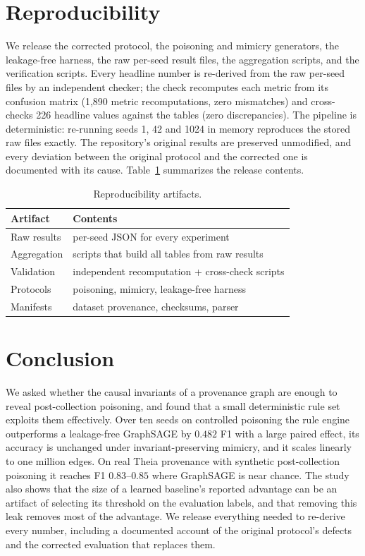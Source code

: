 \documentclass[journal]{IEEEtran}
\begin{document}
\section{Reproducibility}
\label{sec:repro}
We release the corrected protocol, the poisoning and mimicry generators, the
leakage-free harness, the raw per-seed result files, the aggregation scripts,
and the verification scripts. Every headline number is re-derived from the raw
per-seed files by an independent checker; the check recomputes each metric from
its confusion matrix (1{,}890 metric recomputations, zero mismatches) and
cross-checks 226 headline values against the tables (zero discrepancies). The
pipeline is deterministic: re-running seeds 1, 42 and 1024 in memory reproduces
the stored raw files exactly. The repository's original results are preserved
unmodified, and every deviation between the original protocol and the corrected
one is documented with its cause. Table~\ref{tab:repro} summarizes the release
contents.

\begin{table}[t]
\centering
\small
\caption{Reproducibility artifacts.}
\label{tab:repro}
\begin{tabular}{p{3.0cm}p{4.7cm}}
\toprule
Artifact & Contents \\
\midrule
Raw results & per-seed JSON for every experiment \\
Aggregation & scripts that build all tables from raw results \\
Validation & independent recomputation + cross-check scripts \\
Protocols & poisoning, mimicry, leakage-free harness \\
Manifests & dataset provenance, checksums, parser \\
\bottomrule
\end{tabular}
\end{table}

\section{Conclusion}
We asked whether the causal invariants of a provenance graph are enough to reveal
post-collection poisoning, and found that a small deterministic rule set exploits
them effectively. Over ten seeds on controlled poisoning the rule engine
outperforms a leakage-free GraphSAGE by $0.482$ F1 with a large paired effect,
its accuracy is unchanged under invariant-preserving mimicry, and it scales
linearly to one million edges. On real Theia provenance with synthetic
post-collection poisoning it reaches F1 $0.83$--$0.85$ where GraphSAGE is near
chance. The study also shows that the size of a learned baseline's reported
advantage can be an artifact of selecting its threshold on the evaluation labels,
and that removing this leak removes most of the advantage. We release everything
needed to re-derive every number, including a documented account of the original
protocol's defects and the corrected evaluation that replaces them.
\end{document}
